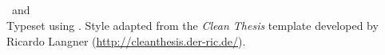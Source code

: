 {\tgherosfont \textbf{\thesisUniversity}} \\
\thesisUniversityDepartment \\
\thesisUniversityInstitute \\
\thesisUniversityStreetAddress \\
\thesisUniversityPostalCode\ and \thesisUniversityCity \\[1.5em]

Typeset using \LaTeXe.
Style adapted from the \textit{Clean Thesis} template developed by Ricardo Langner (\url{http://cleanthesis.der-ric.de/}).
